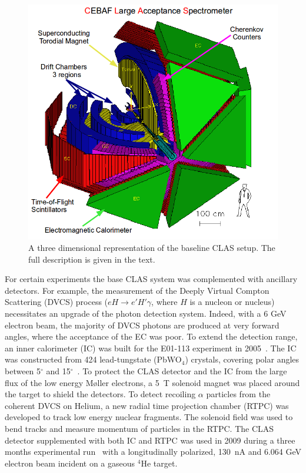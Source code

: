 \documentclass[preprint,5p]{elsarticle}
\begin{document}
\begin{figure}[tbp]
\centering \includegraphics[scale=0.3]{test_clas.png}
\caption{A three dimensional representation of the baseline CLAS setup. The
   full description is given in the text.} \label{fig:CLAS}
\end{figure}

For certain experiments the base CLAS system was complemented with ancillary 
detectors. For example, the measurement of the Deeply Virtual Compton 
Scattering (DVCS) process ($eH \rightarrow e' H' \gamma$, where $H$ is a 
nucleon or nucleus) necessitates an upgrade of the photon detection system.  
Indeed, with a 6 GeV electron beam, the majority of DVCS photons are produced 
at very forward angles, where the acceptance of the EC was poor. To extend the 
detection range, an inner calorimeter (IC) was built for the E01-113 experiment 
in 2005~\cite{Girod:2007aa}. The IC was constructed from 424 lead-tungstate 
(PbWO$_{4}$) crystals, covering polar angles between 5$^{\circ}$ and 
15$^{\circ}$~\cite{Hyon-suk}. To protect the CLAS detector and the IC from the 
large flux of the low energy M{\o}ller electrons, a 5~T solenoid magnet was 
placed around the target to shield the detectors.  To detect recoiling $\alpha$ 
particles from the coherent DVCS on Helium, a new radial time projection 
chamber (RTPC) was developed to track low energy nuclear fragments. The 
solenoid field was used to bend tracks and measure momentum of particles in the 
RTPC. The CLAS detector supplemented with both IC and RTPC was used in 2009 during a 
three months experimental run~\cite{proposal1,proposal2}
with a longitudinally polarized, 130~nA and 6.064 GeV electron beam
incident on a gaseous $^{4}$He target.
\end{document}
